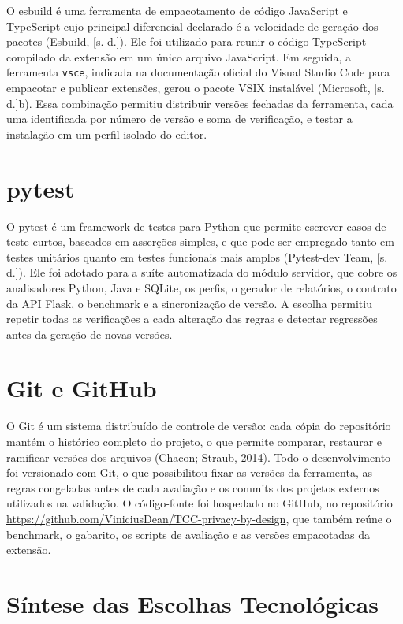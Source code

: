 \documentclass[12pt,a4paper,oneside]{report}
\begin{document}
O esbuild é uma ferramenta de empacotamento de código JavaScript e TypeScript cujo principal diferencial declarado é a velocidade de geração dos pacotes (Esbuild, [s. d.]). Ele foi utilizado para reunir o código TypeScript compilado da extensão em um único arquivo JavaScript. Em seguida, a ferramenta \texttt{vsce}, indicada na documentação oficial do Visual Studio Code para empacotar e publicar extensões, gerou o pacote VSIX instalável (Microsoft, [s. d.]b). Essa combinação permitiu distribuir versões fechadas da ferramenta, cada uma identificada por número de versão e soma de verificação, e testar a instalação em um perfil isolado do editor.

\section{pytest}

O pytest é um framework de testes para Python que permite escrever casos de teste curtos, baseados em asserções simples, e que pode ser empregado tanto em testes unitários quanto em testes funcionais mais amplos (Pytest-dev Team, [s. d.]). Ele foi adotado para a suíte automatizada do módulo servidor, que cobre os analisadores Python, Java e SQLite, os perfis, o gerador de relatórios, o contrato da API Flask, o benchmark e a sincronização de versão. A escolha permitiu repetir todas as verificações a cada alteração das regras e detectar regressões antes da geração de novas versões.

\section{Git e GitHub}

O Git é um sistema distribuído de controle de versão: cada cópia do repositório mantém o histórico completo do projeto, o que permite comparar, restaurar e ramificar versões dos arquivos (Chacon; Straub, 2014). Todo o desenvolvimento foi versionado com Git, o que possibilitou fixar as versões da ferramenta, as regras congeladas antes de cada avaliação e os commits dos projetos externos utilizados na validação. O código-fonte foi hospedado no GitHub, no repositório \url{https://github.com/ViniciusDean/TCC-privacy-by-design}, que também reúne o benchmark, o gabarito, os scripts de avaliação e as versões empacotadas da extensão.

\section{Síntese das Escolhas Tecnológicas}
\end{document}
